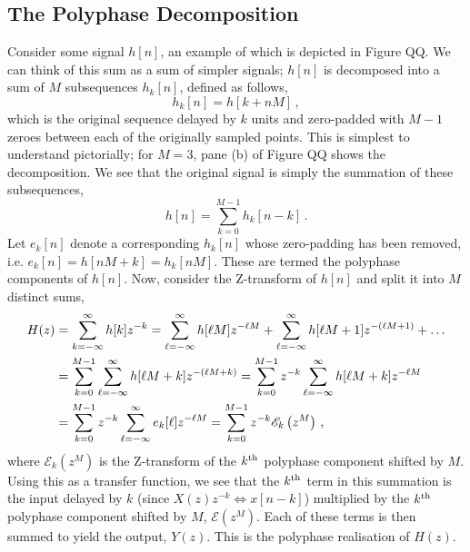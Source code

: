 \subsection{The Polyphase Decomposition}
%
Consider some signal $h[n]$, an example of which is depicted in Figure QQ. We can think
of this sum as a sum of simpler signals; $h[n]$ is decomposed into a sum of $M$
subsequences $h_k[n]$, defined as follows,
%
\begin{displaymath}
  h_k[n] = h[k + nM] \,,
\end{displaymath}
%
which is the original sequence delayed by $k$ units and zero-padded with $M-1$ zeroes
between each of the originally sampled points. This is simplest to understand pictorially;
for $M=3$, pane (b) of Figure QQ shows the decomposition. We see that the original
signal is simply the summation of these subsequences,
%
\begin{displaymath}
  h[n] = \sum_{k=0}^{M-1}h_k[n-k] \,.
\end{displaymath}
%
Let $e_k[n]$ denote a corresponding $h_k[n]$ whose zero-padding has been removed, i.e.
$e_k[n] = h[nM + k] = h_k[nM]$. These are termed the polyphase components of $h[n]$.
Now, consider the Z-transform of $h[n]$ and split it into $M$ distinct sums,
%
\begin{align*}
  H(z) &= \sum_{k=-\infty}^\infty h[k]z^{-k}
  = \sum_{\ell=-\infty}^\infty h[\ell M]z^{-\ell M} + \sum_{\ell=-\infty}^\infty h[\ell M+1]z^{-(\ell M + 1)} + \hdots \\
  &= \sum_{k=0}^{M-1}\sum_{\ell=-\infty}^\infty h[\ell M + k]z^{-(\ell M + k)}
  = \sum_{k=0}^{M-1}z^{-k}\sum_{\ell=-\infty}^\infty h[\ell M + k]z^{-\ell M} \\
  &= \sum_{k=0}^{M-1}z^{-k} \sum_{\ell=-\infty}^\infty e_k[\ell]z^{-\ell M}
  = \sum_{k=0}^{M-1}z^{-k}\mathscr{E}_k\left(z^M\right) \,,
\end{align*}
%
where $\mathscr{E}_k\left(z^M\right)$ is the Z-transform of the $k^\mathrm{th}\mkern1mu$ polyphase
component shifted by $M$. Using this as a transfer function, we see that the
$k^\mathrm{th}\mkern1mu$ term in this summation is the input delayed by $k$ (since
$X(z)z^{-k} \Longleftrightarrow x[n-k]$) multiplied by the $k^\mathrm{th}\mkern1mu$ polyphase
component shifted by $M$, $\mathscr{E}\left(z^M\right)$. Each of these terms
is then summed to yield the output, $Y(z)$. This is the \textrm{polyphase realisation}
of $H(z)$.\\

